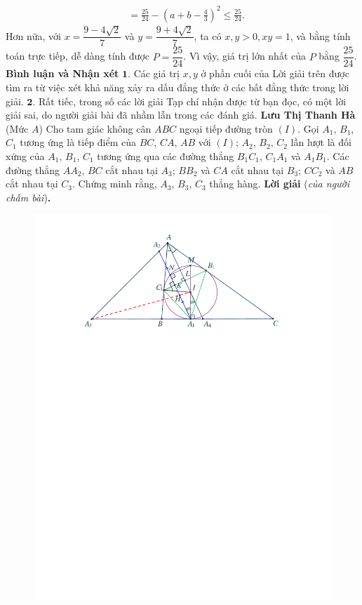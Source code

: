 \begin{multicols}{2}
\begin{align*}
		 &= \frac{{25}}{{24}} - {\left( {a + b - \frac{4}{3}} \right)^2} \le \frac{{25}}{{24}}.
	\end{align*}
	Hơn nữa, với  $x = \dfrac{{9 - 4\sqrt 2 }}{7}$ và  $y = \dfrac{{9 + 4\sqrt 2 }}{7}$, ta có $x, y > 0, xy = 1$, và bằng tính toán trực tiếp, dễ dàng tính được  $P = \dfrac{25}{24}$.
	\vskip 0.05cm
	Vì vậy, giá trị lớn nhất của $P$ bằng  $\dfrac{25}{24}$.
	\vskip 0.05cm
	\textbf{\color{thachthuctoanhoc}Bình luận và Nhận xét}
	\vskip 0.05cm
	$\pmb{1.}$ Các giá trị $x, y$ ở phần cuối của Lời giải trên được tìm ra từ việc xét khả năng xảy ra dấu đẳng thức ở các bất đẳng thức trong lời giải.
	\vskip 0.05cm
	$\pmb{2.}$ Rất tiếc, trong số các lời giải Tạp chí nhận được từ bạn đọc, có một lời giải sai, do người giải bài đã nhầm lẫn trong các đánh giá.
	\vskip 0.05cm
	\hfill\textbf{\color{thachthuctoanhoc}Lưu Thị Thanh Hà}
	\vskip 0.05cm
	{}
	(Mức $A$) Cho tam giác không cân $ABC$ ngoại tiếp đường tròn $(I)$. Gọi $A_1$, $B_1$, $C_1$ tương ứng là tiếp điểm của $BC$, $CA$, $AB$ với $(I)$; $A_2$, $B_2$, $C_2$ lần lượt là đối xứng của $A_1$, $B_1$, $C_1$ tương ứng qua các đường thẳng $B_1C_1$, $C_1A_1$ và $A_1B_1$. Các đường thẳng $AA_2$, $BC$ cắt nhau tại $A_3$; $BB_2$ và $CA$ cắt nhau tại $B_3$; $CC_2$ và $AB$ cắt nhau tại $C_3$. Chứng minh rằng, $A_3$, $B_3$, $C_3$ thẳng hàng.
	\vskip 0.05cm
	\textbf{\color{thachthuctoanhoc}Lời giải} (\textit{của người chấm bài})\textbf{\color{thachthuctoanhoc}.}
	\begin{figure}[H]
		\centering
		\vspace*{-10pt}
		\captionsetup{labelformat= empty, justification=centering}
		\includegraphics[width=1\linewidth]{P628}

\end{figure}
\end{multicols}

